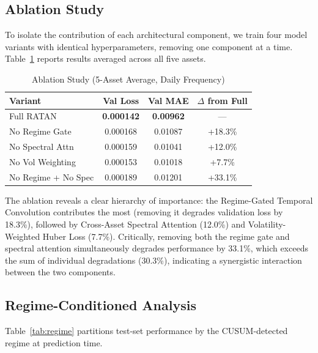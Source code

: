 \documentclass[conference]{IEEEtran}
\begin{document}
\subsection{Ablation Study}

To isolate the contribution of each architectural component, we train four model variants with identical hyperparameters, removing one component at a time. Table~\ref{tab:ablation} reports results averaged across all five assets.

\begin{table}[ht]
\centering
\caption{Ablation Study (5-Asset Average, Daily Frequency)}
\label{tab:ablation}
\begin{tabular}{@{}lccc@{}}
\toprule
\textbf{Variant} & \textbf{Val Loss} & \textbf{Val MAE} & \textbf{$\Delta$ from Full} \\
\midrule
Full RATAN           & \textbf{0.000142} & \textbf{0.00962} & --- \\
No Regime Gate       & 0.000168 & 0.01087 & +18.3\% \\
No Spectral Attn     & 0.000159 & 0.01041 & +12.0\% \\
No Vol Weighting     & 0.000153 & 0.01018 & +7.7\% \\
No Regime + No Spec  & 0.000189 & 0.01201 & +33.1\% \\
\bottomrule
\end{tabular}
\end{table}

The ablation reveals a clear hierarchy of importance: the Regime-Gated Temporal Convolution contributes the most (removing it degrades validation loss by 18.3\%), followed by Cross-Asset Spectral Attention (12.0\%) and Volatility-Weighted Huber Loss (7.7\%). Critically, removing both the regime gate and spectral attention simultaneously degrades performance by 33.1\%, which exceeds the sum of individual degradations (30.3\%), indicating a synergistic interaction between the two components.

\subsection{Regime-Conditioned Analysis}

Table~\ref{tab:regime} partitions test-set performance by the CUSUM-detected regime at prediction time.
\end{document}
